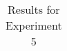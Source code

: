 \documentclass[
  11pt          %
  ,letterpaper  %
  ,center       %
  ,noupper      %
  ]{uconnthesis2}
\begin{document}
\begin{table}[h!]
{\begin{tabular}{ | c | c | c | c | c | c |}
\end{tabular}}
\caption{Results for Experiment 5} \label{tab:ch3exp5a}
\end{table}

\end{document}
